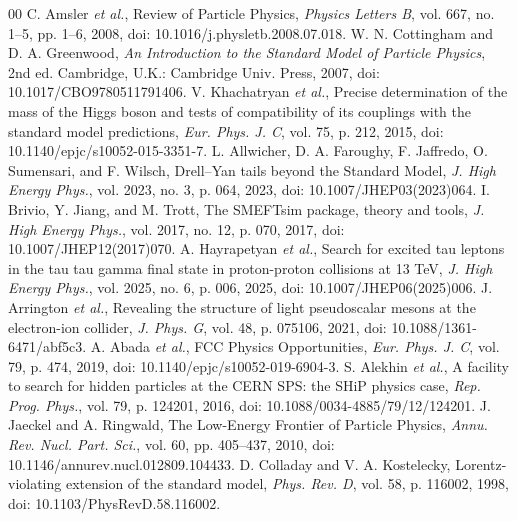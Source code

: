 \begin{thebibliography}{00}
 C. Amsler \emph{et al.}, Review of Particle Physics, \emph{Physics Letters B}, vol. 667, no. 1--5, pp. 1--6, 2008, doi: 10.1016/j.physletb.2008.07.018.
 W. N. Cottingham and D. A. Greenwood, \emph{An Introduction to the Standard Model of Particle Physics}, 2nd ed. Cambridge, U.K.: Cambridge Univ. Press, 2007, doi: 10.1017/CBO9780511791406.
 V. Khachatryan \emph{et al.}, Precise determination of the mass of the Higgs boson and tests of compatibility of its couplings with the standard model predictions, \emph{Eur. Phys. J. C}, vol. 75, p. 212, 2015, doi: 10.1140/epjc/s10052-015-3351-7.
 L. Allwicher, D. A. Faroughy, F. Jaffredo, O. Sumensari, and F. Wilsch, Drell--Yan tails beyond the Standard Model, \emph{J. High Energy Phys.}, vol. 2023, no. 3, p. 064, 2023, doi: 10.1007/JHEP03(2023)064.
 I. Brivio, Y. Jiang, and M. Trott, The SMEFTsim package, theory and tools, \emph{J. High Energy Phys.}, vol. 2017, no. 12, p. 070, 2017, doi: 10.1007/JHEP12(2017)070.
 A. Hayrapetyan \emph{et al.}, Search for excited tau leptons in the tau tau gamma final state in proton-proton collisions at 13 TeV, \emph{J. High Energy Phys.}, vol. 2025, no. 6, p. 006, 2025, doi: 10.1007/JHEP06(2025)006.
 J. Arrington \emph{et al.}, Revealing the structure of light pseudoscalar mesons at the electron-ion collider, \emph{J. Phys. G}, vol. 48, p. 075106, 2021, doi: 10.1088/1361-6471/abf5c3.
 A. Abada \emph{et al.}, FCC Physics Opportunities, \emph{Eur. Phys. J. C}, vol. 79, p. 474, 2019, doi: 10.1140/epjc/s10052-019-6904-3.
 S. Alekhin \emph{et al.}, A facility to search for hidden particles at the CERN SPS: the SHiP physics case, \emph{Rep. Prog. Phys.}, vol. 79, p. 124201, 2016, doi: 10.1088/0034-4885/79/12/124201.
 J. Jaeckel and A. Ringwald, The Low-Energy Frontier of Particle Physics, \emph{Annu. Rev. Nucl. Part. Sci.}, vol. 60, pp. 405--437, 2010, doi: 10.1146/annurev.nucl.012809.104433.
 D. Colladay and V. A. Kostelecky, Lorentz-violating extension of the standard model, \emph{Phys. Rev. D}, vol. 58, p. 116002, 1998, doi: 10.1103/PhysRevD.58.116002.
\end{thebibliography}
